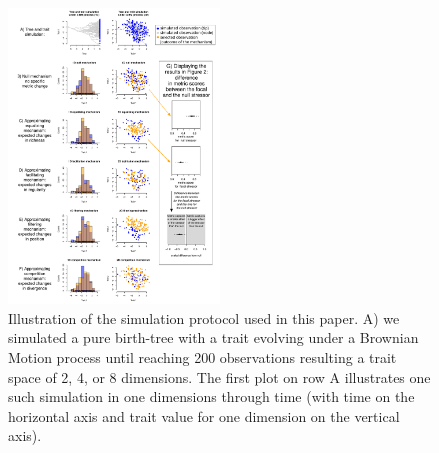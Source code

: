 \documentclass[12pt,letterpaper]{article}
\providecommand{\DIFaddbeginFL}{} %
\providecommand{\DIFaddendFL}{} %
\providecommand{\DIFdelbeginFL}{} %
\providecommand{\DIFdelendFL}{} %
\newcommand{\DIFscaledelfig}{0.5}
\newlength{\DIFdelgraphicswidth} %
\newlength{\DIFdelgraphicsheight} %
\newcommand{\DIFaddincludegraphics}[2][]{{\color{blue}\fbox{\DIFOincludegraphics[#1]{#2}}}} %
\newcommand{\DIFdelincludegraphics}[2][]{%
\sbox{\DIFdelgraphicsbox}{\DIFOincludegraphics[#1]{#2}}%
\settoboxwidth{\DIFdelgraphicswidth}{\DIFdelgraphicsbox} %
\settoboxtotalheight{\DIFdelgraphicsheight}{\DIFdelgraphicsbox} %
\scalebox{\DIFscaledelfig}{%
\parbox[b]{\DIFdelgraphicswidth}{\usebox{\DIFdelgraphicsbox}\\[-\baselineskip] \rule{\DIFdelgraphicswidth}{0em}}\llap{\resizebox{\DIFdelgraphicswidth}{\DIFdelgraphicsheight}{%
\setlength{\unitlength}{\DIFdelgraphicswidth}%
\begin{picture}(1,1)%
\thicklines\linethickness{2pt} %
{\color[rgb]{1,0,0}\put(0,0){\framebox(1,1){}}}%
{\color[rgb]{1,0,0}\put(0,0){\line( 1,1){1}}}%
{\color[rgb]{1,0,0}\put(0,1){\line(1,-1){1}}}%
\end{picture}%
}\hspace*{3pt}}} %
} %
\DeclareRobustCommand{\DIFaddbeginFL}{\DIFOaddbeginFL \let\includegraphics\DIFaddincludegraphics} %
\DeclareRobustCommand{\DIFaddendFL}{\DIFOaddendFL \let\includegraphics\DIFOincludegraphics} %
\DeclareRobustCommand{\DIFdelbeginFL}{\DIFOdelbeginFL \let\includegraphics\DIFdelincludegraphics} %
\DeclareRobustCommand{\DIFdelendFL}{\DIFOaddendFL \let\includegraphics\DIFOincludegraphics} %
\begin{document}
\begin{figure}[!htbp]
\centering
   \DIFdelbeginFL %
\DIFdelendFL \DIFaddbeginFL \includegraphics[width=0.5\textwidth]{Figures/simulation_protocol_explained.pdf}
\DIFaddendFL \caption{\DIFdelbeginFL %
\DIFdelendFL \DIFaddbeginFL \scriptsize{Illustration of the simulation protocol used in this paper.
A) we simulated a pure birth-tree with a trait evolving under a Brownian Motion process until reaching 200 observations resulting a trait space of 2, 4, or 8 dimensions.
The first plot on row A illustrates one such simulation in one dimensions through time (with time on the horizontal axis and trait value for one dimension on the vertical axis).
}}
\end{figure}
\end{document}
